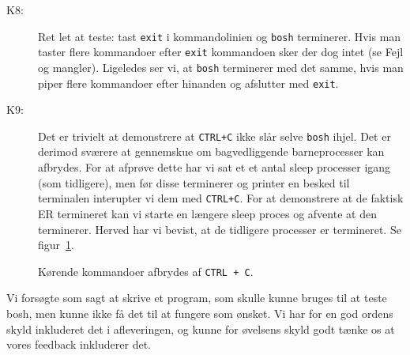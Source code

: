 \documentclass[final]{article}
\begin{document}
\begin{description}
\item[K8:] Ret let at teste: tast \texttt{exit} i kommandolinien og \texttt{bosh} terminerer. Hvis man taster flere kommandoer efter \texttt{exit} kommandoen sker der dog intet (se Fejl og mangler). Ligeledes ser vi, at \texttt{bosh} terminerer med det samme, hvis man piper flere kommandoer efter hinanden og afslutter med \texttt{exit}.

\item[K9:] Det er trivielt at demonstrere at \texttt{CTRL+C} ikke slår selve \texttt{bosh} ihjel. Det er derimod sværere at gennemskue om bagvedliggende barneprocesser kan afbrydes. For at afprøve dette har vi sat et et antal sleep processer igang (som tidligere), men før disse terminerer og printer en besked til terminalen interupter vi dem med \texttt{CTRL+C}. For at demonstrere at de faktisk ER termineret kan vi starte en længere sleep proces og afvente at den terminerer. Herved har vi bevist, at de tidligere processer er termineret. Se figur~\ref{fig:ctrlctest}.

\end{description}
\begin{figure}[H]
\center
{}
\caption{Kørende kommandoer afbrydes af \texttt{CTRL + C}.}
\label{fig:ctrlctest}
\end{figure}

Vi forsøgte som sagt at skrive et program, som skulle kunne bruges til at teste bosh, men kunne ikke få det til at fungere som ønsket. Vi har for en god ordens skyld inkluderet det i afleveringen, og kunne for øvelsens skyld godt tænke os at vores feedback inkluderer det.


\end{document}
